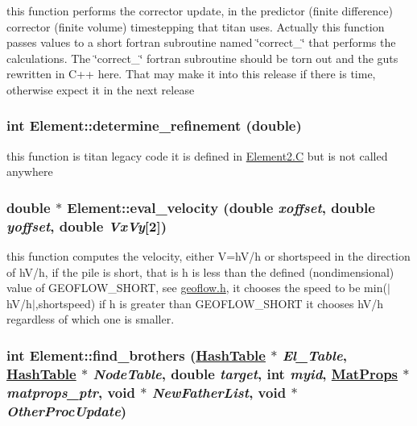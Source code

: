 this function performs the corrector update, in the predictor (finite difference) corrector (finite volume) timestepping that titan uses. Actually this function passes values to a short fortran subroutine named \char`\"{}correct\_\-\char`\"{} that performs the calculations. The \char`\"{}correct\_\-\char`\"{} fortran subroutine should be torn out and the guts rewritten in C++ here. That may make it into this release if there is time, otherwise expect it in the next release 

\hypertarget{classElement_a88}{
\subsubsection[determine\_\-refinement]{\setlength{\rightskip}{0pt plus 5cm}int Element::determine\_\-refinement (double)}}
\label{classElement_a88}


this function is titan legacy code it is defined in \hyperlink{constant_8h_a21}{Element2.C} but is not called anywhere 

\hypertarget{classElement_a84}{
\subsubsection[eval\_\-velocity]{\setlength{\rightskip}{0pt plus 5cm}double $\ast$ Element::eval\_\-velocity (double {\em xoffset}, double {\em yoffset}, double {\em Vx\-Vy}\mbox{[}2\mbox{]})}}
\label{classElement_a84}


this function computes the velocity, either V=h\-V/h or shortspeed in the direction of h\-V/h, if the pile is short, that is h is less than the defined (nondimensional) value of GEOFLOW\_\-SHORT, see \hyperlink{geoflow_8h}{geoflow.h}, it chooses the speed to be min($|$h\-V/h$|$,shortspeed) if h is greater than GEOFLOW\_\-SHORT it chooses h\-V/h regardless of which one is smaller. 

\hypertarget{classElement_a98}{
\subsubsection[find\_\-brothers]{\setlength{\rightskip}{0pt plus 5cm}int Element::find\_\-brothers (\hyperlink{classHashTable}{Hash\-Table} $\ast$ {\em El\_\-Table}, \hyperlink{classHashTable}{Hash\-Table} $\ast$ {\em Node\-Table}, double {\em target}, int {\em myid}, \hyperlink{structMatProps}{Mat\-Props} $\ast$ {\em matprops\_\-ptr}, void $\ast$ {\em New\-Father\-List}, void $\ast$ {\em Other\-Proc\-Update})}}
\label{classElement_a98}


